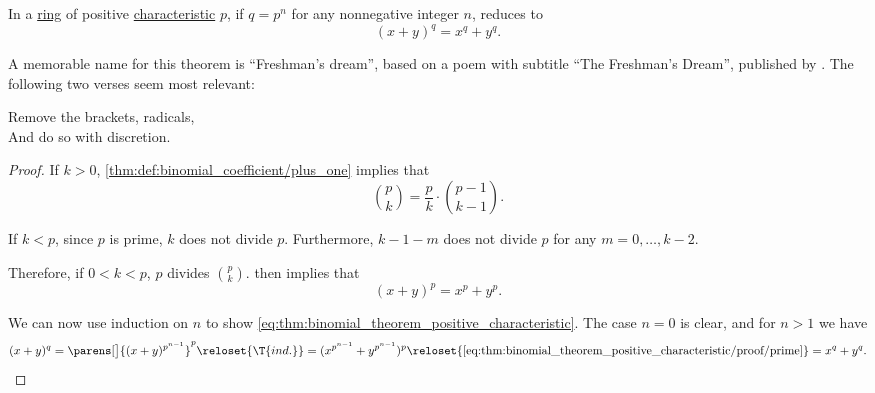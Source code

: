\begin{corollary}\label{thm:binomial_theorem_positive_characteristic}
  In a \hyperref[def:ring]{ring} of positive \hyperref[def:ring_characteristic]{characteristic} \( p \), if \( q = p^n \) for any nonnegative integer \( n \),  reduces to
  \begin{equation}\label{eq:thm:binomial_theorem_positive_characteristic}
    (x + y)^q = x^q + y^q.
  \end{equation}
\end{corollary}
\begin{comments}
  \item A memorable name for this theorem is \enquote{Freshman's dream}, based on a poem with subtitle \enquote{The Freshman's Dream}, published by \textcite{Gleason1938FreshmansDream}. The following two verses seem most relevant:
  \begin{displayquote}
    Remove the brackets, radicals, \\
    And do so with discretion.
  \end{displayquote}
\end{comments}
\begin{proof}
  If \( k > 0 \), \cref{thm:def:binomial_coefficient/plus_one} implies that
  \begin{equation*}
    \binom p k = \frac p k \cdot \binom {p - 1} {k - 1}.
  \end{equation*}

  If \( k < p \), since \( p \) is prime, \( k \) does not divide \( p \). Furthermore, \( k - 1 - m \) does not divide \( p \) for any \( m = 0, \ldots, k - 2 \).

  Therefore, if \( 0 < k < p \), \( p \) divides \( \binom p k \).  then implies that
  \begin{equation}\label{eq:thm:binomial_theorem_positive_characteristic/proof/prime}
    (x + y)^p = x^p + y^p.
  \end{equation}

  We can now use induction on \( n \) to show \eqref{eq:thm:binomial_theorem_positive_characteristic}. The case \( n = 0 \) is clear, and for \( n > 1 \) we have
  \begin{equation*}
    (x + y)^q
    =
    \parens[\big]{ (x + y)^{p^{n-1}} }^p
    \reloset {\T{ind.}} =
    (x^{p^{n-1}} + y^{p^{n-1}})^p
    \reloset {\eqref{eq:thm:binomial_theorem_positive_characteristic/proof/prime}} =
    x^q + y^q.
  \end{equation*}
\end{proof}


